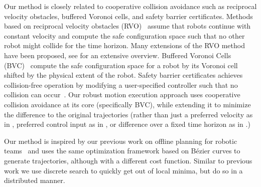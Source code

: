 \documentclass{svproc}
\begin{document}
Our method is closely related to cooperative collision avoidance such as reciprocal velocity obstacles, buffered Voronoi cells, and safety barrier certificates.
Methods based on reciprocal velocity obstacles (RVO)~\cite{RVO} assume that robots continue with constant velocity and compute the safe configuration space such that no other robot might collide for the time horizon.
Many extensions of the RVO method have been proposed, see \cite{epsilonCCA} for an extensive overview.
Buffered Voronoi Cells (BVC)~\cite{bufferedVoronoiCells} compute the safe configuration space for a robot by its Voronoi cell shifted by the physical extent of the robot. 
Safety barrier certificates achieves collision-free operation by modifying a user-specified controller such that no collision can occur~\cite{barrierCertificates}.
Our robust motion execution approach uses cooperative collision avoidance at its core (specifically BVC), while extending it to minimize the difference to the original trajectories (rather than just a preferred velocity as in \cite{epsilonCCA}, preferred control input as in \cite{barrierCertificates}, or difference over a fixed time horizon as in \cite{bufferedVoronoiCells}.)

Our method is inspired by our previous work on offline planning for robotic teams~\cite{crazyplanning-ieeetro} and uses the same optimization framework based on B\'ezier curves to generate trajectories, although with a different cost function.
Similar to previous work we use discrete search to quickly get out of local minima, but do so in a distributed manner.
\end{document}
